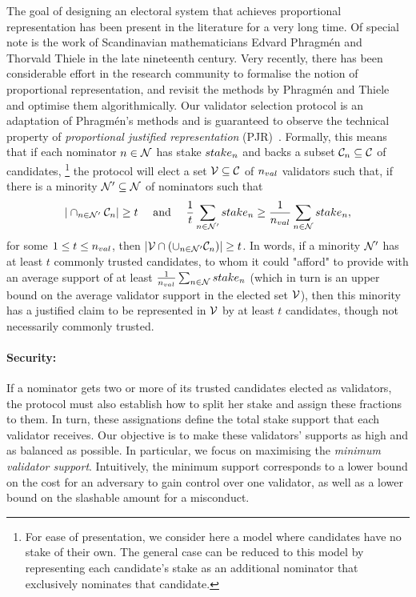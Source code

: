 The goal of designing an electoral system that achieves proportional representation has been present in the literature for a very long time. Of special note is the work of Scandinavian mathematicians Edvard Phragm\'{e}n and Thorvald Thiele in the late nineteenth century. Very recently, there has been considerable effort in the research community to formalise the notion of proportional representation, and revisit the methods by Phragm\'{e}n and Thiele and optimise them algorithmically. 
Our validator selection protocol is an adaptation of Phragm\'{e}n's methods and is guaranteed 
to observe the technical property of \emph{proportional justified representation} (PJR)~\cite{sanchez2017proportional, brill2017phragmen}. 
Formally, this means that if each nominator $n \in \mathcal{N}$ has stake $stake_{n}$ 
and backs a subset $\mathcal{C}_{n}\subseteq \mathcal{C}$ of candidates,%
%
\footnote{For ease of presentation, we consider here a model where candidates have no stake of their own. 
The general case can be reduced to this model by representing each candidate's stake as an additional nominator 
that exclusively nominates that candidate.} %
%
the protocol will elect a set $\mathcal{V}\subseteq \mathcal{C}$ of $n_{val}$ validators such that, 
if there is a minority $\mathcal{N}'\subseteq \mathcal{N}$ of nominators such that %
%
$$|\cap_{n\in \mathcal{N}'} \mathcal{C}_n| \geq t \quad \text{ and } \quad
\frac{1}{t} \sum_{n\in \mathcal{N}'} stake_{n} \geq \frac{1}{n_{val}} \sum_{n\in \mathcal{N}} stake_{n},$$
%
for some $1\leq t\leq n_{val}$, then $|\mathcal{V}\cap (\cup_{n\in\mathcal{N}'} \mathcal{C}_n)| \geq t$.
In words, if a minority $\mathcal{N}'$ has at least $t$ commonly trusted candidates, 
to whom it could "afford" to provide with an average support of at least 
$\frac{1}{n_{val}} \sum_{n\in \mathcal{N}} stake_{n}$ 
(which in turn is an upper bound on the average validator support in the elected set $\mathcal{V}$), 
then this minority has a justified claim to be represented in $\mathcal{V}$ by at least $t$ candidates,  
though not necessarily commonly trusted.

\paragraph{Security:} If a nominator gets two or more of its trusted candidates elected as validators,
the protocol must also establish how to split her stake and assign these fractions to them.
In turn, these assignations define the total stake support that each validator receives.
Our objective is to make these validators' supports as high and as balanced as possible.
In particular, we focus on maximising the \emph{minimum validator support}.
Intuitively, the minimum support corresponds to a lower bound on the cost for an adversary to gain control
over one validator, as well as a lower bound on the slashable amount for a misconduct.

